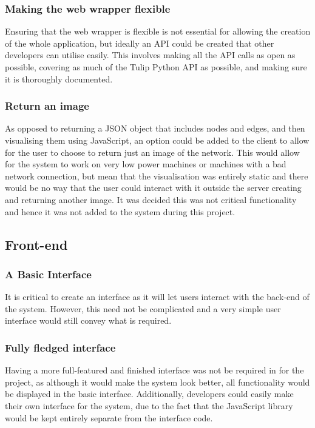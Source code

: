 \documentclass[../dissertation.tex]{subfiles}
\begin{document}
\subsubsection{Making the web wrapper flexible}

Ensuring that the web wrapper is flexible is not essential for allowing the creation of the whole application, but ideally an API could be created that other developers can utilise easily. This involves making all the API calls as open as possible, covering as much of the Tulip Python API as possible, and making sure it is thoroughly documented. 

\subsubsection{Return an image}

As opposed to returning a JSON object that includes nodes and edges, and then visualising them using JavaScript, an option could be added to the client to allow for the user to choose to return just an image of the network. This would allow for the system to work on very low power machines or machines with a bad network connection, but mean that the visualisation was entirely static and there would be no way that the user could interact with it outside the server creating and returning another image. It was decided this was not critical functionality and hence it was not added to the system during this project.

\subsection{Front-end}

\subsubsection{A Basic Interface}

It is critical to create an interface as it will let users interact with the back-end of the system. However, this need not be complicated and a very simple user interface would still convey what is required.

\subsubsection{Fully fledged interface}

Having a more full-featured and finished interface was not be required in for the project, as although it would make the system look better, all functionality would be displayed in the basic interface. Additionally, developers could easily make their own interface for the system, due to the fact that the JavaScript library would be kept entirely separate from the interface code.
\end{document}
